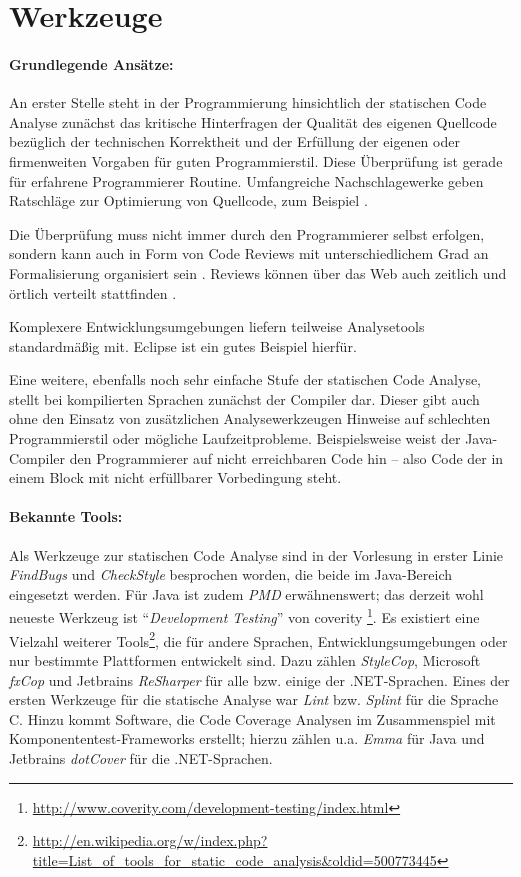 \section{Werkzeuge}

\paragraph{Grundlegende Ansätze:} An erster Stelle steht in der Programmierung hinsichtlich der statischen Code Analyse zunächst das kritische Hinterfragen der Qualität des eigenen Quellcode bezüglich der technischen Korrektheit und der  Erfüllung der eigenen oder firmenweiten Vorgaben für guten Programmierstil. Diese Überprüfung ist gerade für erfahrene Programmierer Routine. Umfangreiche Nachschlagewerke geben Ratschläge zur Optimierung von Quellcode, zum Beispiel \cite{mcconnell2004}.

Die Überprüfung muss nicht immer durch den Programmierer selbst erfolgen, sondern kann auch in Form von Code Reviews mit unterschiedlichem Grad an Formalisierung organisiert sein \citep{spillner2011}. Reviews können über das Web auch zeitlich und örtlich verteilt stattfinden \citep{codereviews:meyer}.

Komplexere Entwicklungsumgebungen liefern teilweise Analysetools standardmäßig mit. Eclipse ist ein gutes Beispiel hierfür.

Eine weitere, ebenfalls noch sehr einfache Stufe der statischen Code Analyse, stellt bei kompilierten Sprachen zunächst der Compiler dar. Dieser gibt auch ohne den Einsatz von zusätzlichen Analysewerkzeugen Hinweise auf schlechten Programmierstil oder mögliche Laufzeitprobleme. Beispielsweise weist der Java-Compiler den Programmierer auf nicht erreichbaren Code hin -- also Code der in einem Block mit nicht erfüllbarer Vorbedingung steht.

\paragraph{Bekannte Tools:} Als Werkzeuge zur statischen Code Analyse sind in der Vorlesung in erster Linie \textit{FindBugs} und \textit{CheckStyle} besprochen worden, die beide im Java-Bereich eingesetzt werden. Für Java ist zudem \textit{PMD} erwähnenswert; das derzeit wohl neueste Werkzeug ist ``\textit{Development Testing}'' von coverity \citep{neumann2012}\footnote{\url{http://www.coverity.com/development-testing/index.html}}. Es existiert eine Vielzahl weiterer Tools\footnote{\url{http://en.wikipedia.org/w/index.php?title=List_of_tools_for_static_code_analysis\&oldid=500773445}}, die für andere Sprachen, Entwicklungsumgebungen oder nur bestimmte Plattformen entwickelt sind. Dazu zählen \textit{StyleCop}, Microsoft \textit{fxCop} und Jetbrains \textit{ReSharper} für alle bzw. einige der .NET-Sprachen. Eines der ersten Werkzeuge für die statische Analyse war \textit{Lint} bzw. \textit{Splint} für die Sprache C. Hinzu kommt Software, die  Code Coverage Analysen im Zusammenspiel mit Komponententest-Frameworks erstellt; hierzu zählen u.a. \textit{Emma} für Java und Jetbrains \textit{dotCover} für die .NET-Sprachen.


